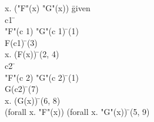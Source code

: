 \documentclass{article}
\begin{document}
\begin{proofbox}
\: \forall x. ("F"(x) \land "G"(x)) \= \hbox{given} \\
\open
\: c1 \= \forallintroconst \\
\: "F"(c 1) \land "G"(c 1) \= \forallelim(1) \\
\: F(c1) \= \andelim(3) \\
\close
\: \forall x. (F(x)) \= \forallintro(2, 4) \\
\open
\: c2 \= \forallintroconst \\
\: "F"(c 2) \land "G"(c 2) \= \forallelim(1) \\
\: G(c2) \= \andelim(7) \\
\close
\: \forall x. (G(x)) \= \forallintro(6, 8) \\
\: (forall x. "F"(x)) \land (forall x. "G"(x)) \= \andintro(5, 9) \\
\end{proofbox}
\end{document}
